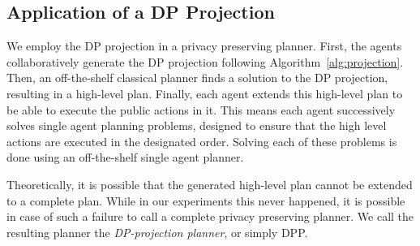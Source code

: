 \documentclass[letterpaper]{article}
\theoremstyle{definition}
\begin{document}




\subsection{Application of a DP Projection}

We employ the DP projection in a privacy preserving planner. First, the agents collaboratively generate the DP projection following Algorithm~\ref{alg:projection}. Then, an off-the-shelf classical planner finds a solution to the DP projection, resulting in a high-level plan. Finally, each agent extends this high-level plan to be able to execute the public actions in it. This means each agent successively solves single agent planning problems, designed to ensure that the high level actions are executed in the designated order. Solving each of these problems is done using an off-the-shelf single agent planner.



Theoretically, it is possible that the generated high-level plan cannot be extended to a complete plan. While in our experiments this never happened, it is possible in case of such a failure to call a complete privacy preserving planner. We call the resulting planner the {\em DP-projection planner}, or simply DPP.





\end{document}
